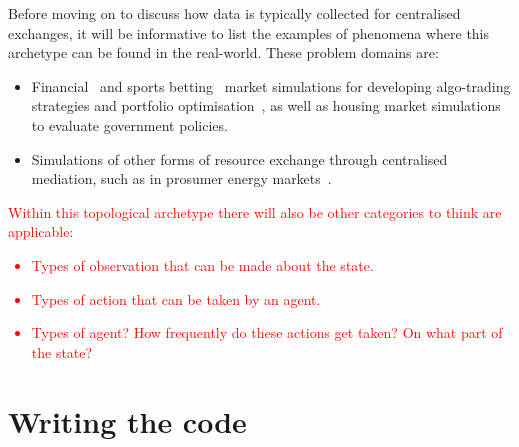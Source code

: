 Before moving on to discuss how data is typically collected for centralised exchanges, it will be informative to list the examples of phenomena where this archetype can be found in the real-world. These problem domains are:
\begin{itemize}
\item{Financial~\cite{fischer2018reinforcement,meng2019reinforcement} and sports betting~\cite{cliff2021bbe} market simulations for developing algo-trading strategies and portfolio optimisation~\cite{dangi2013financial}, as well as housing market simulations~\cite{yilmaz2018stochastic,carro2023heterogeneous} to evaluate government policies.}
\item{Simulations of other forms of resource exchange through centralised mediation, such as in prosumer energy markets~\cite{may2023multi}.} 
\end{itemize}

\textcolor{red}{Within this topological archetype there will also be other categories to think are applicable:
\begin{itemize}
\item{Types of observation that can be made about the state.}
\item{Types of action that can be taken by an agent.}
\item{Types of agent? How frequently do these actions get taken? On what part of the state?}
\end{itemize}
}

\section{\sffamily Writing the code}
